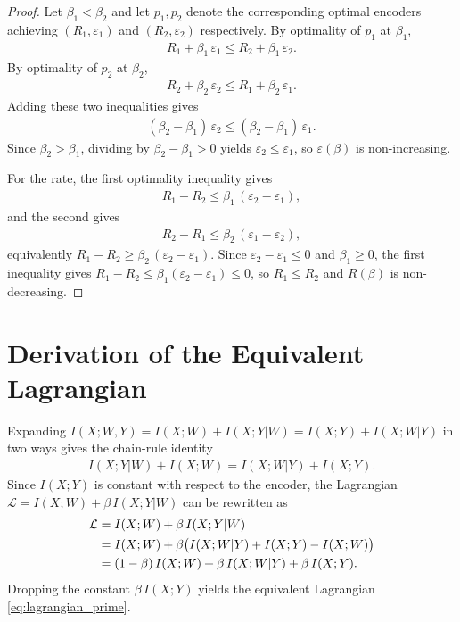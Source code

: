 \documentclass[11pt]{article}
\begin{document}
\begin{proof}
Let $\beta_1<\beta_2$ and let $p_1,p_2$ denote the corresponding
optimal encoders achieving $(R_1,\varepsilon_1)$ and
$(R_2,\varepsilon_2)$ respectively.
By optimality of $p_1$ at $\beta_1$,
\begin{align}
    R_1 + \beta_1\,\varepsilon_1 \leq R_2 + \beta_1\,\varepsilon_2.
\end{align}
By optimality of $p_2$ at $\beta_2$,
\begin{align}
    R_2 + \beta_2\,\varepsilon_2 \leq R_1 + \beta_2\,\varepsilon_1.
\end{align}
Adding these two inequalities gives
\begin{align}
    (\beta_2-\beta_1)\,\varepsilon_2
    \leq (\beta_2-\beta_1)\,\varepsilon_1.
\end{align}
Since $\beta_2>\beta_1$, dividing by $\beta_2-\beta_1>0$ yields
$\varepsilon_2\leq\varepsilon_1$, so $\varepsilon(\beta)$ is
non-increasing.

For the rate, the first optimality inequality gives
\begin{align}
    R_1 - R_2 \leq \beta_1\,(\varepsilon_2 - \varepsilon_1),
\end{align}
and the second gives
\begin{align}
    R_2 - R_1 \leq \beta_2\,(\varepsilon_1 - \varepsilon_2),
\end{align}
equivalently $R_1 - R_2 \geq \beta_2\,(\varepsilon_2-\varepsilon_1)$.
Since $\varepsilon_2-\varepsilon_1\leq 0$ and $\beta_1\geq 0$, the
first inequality gives
$R_1-R_2\leq\beta_1(\varepsilon_2-\varepsilon_1)\leq 0$, so
$R_1\leq R_2$ and $R(\beta)$ is non-decreasing.
\end{proof}

\section{Derivation of the Equivalent Lagrangian}
\label{app:lagrangian_deriv}

Expanding $I(X;W,Y)=I(X;W)+I(X;Y|W)=I(X;Y)+I(X;W|Y)$ in two ways
gives the chain-rule identity
\begin{align}
    I(X;Y|W) + I(X;W) = I(X;W|Y) + I(X;Y).
    \label{eq:cmi_identity}
\end{align}
Since $I(X;Y)$ is constant with respect to the encoder, the
Lagrangian $\mathcal{L}=I(X;W)+\beta\,I(X;Y|W)$ can be rewritten as
\begin{align}
    \mathcal{L}
    &= I(X;W) + \beta\,I(X;Y|W) \notag\\
    &= I(X;W) + \beta\bigl(I(X;W|Y) + I(X;Y) - I(X;W)\bigr) \notag\\
    &= (1-\beta)\,I(X;W) + \beta\,I(X;W|Y) + \beta\,I(X;Y).
    \label{eq:lagrangian_equiv}
\end{align}
Dropping the constant $\beta\,I(X;Y)$ yields the equivalent
Lagrangian \eqref{eq:lagrangian_prime}.
\end{document}
